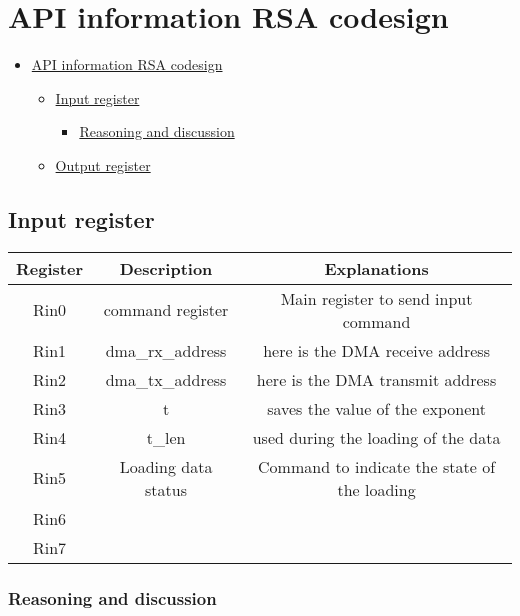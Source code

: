 \documentclass[
]{article}
\author{}
\date{}
\begin{document}
\hypertarget{api-information-rsa-codesign}{%
\section{API information RSA
codesign}\label{api-information-rsa-codesign}}

\begin{itemize}
\tightlist
\item
  \protect\hyperlink{api-information-rsa-codesign}{API information RSA
  codesign}

  \begin{itemize}
  \tightlist
  \item
    \protect\hyperlink{input-register}{Input register}

    \begin{itemize}
    \tightlist
    \item
      \protect\hyperlink{reasoning-and-discussion}{Reasoning and
      discussion}
    \end{itemize}
  \item
    \protect\hyperlink{output-register}{Output register}
  \end{itemize}
\end{itemize}

\hypertarget{input-register}{%
\subsection{Input register}\label{input-register}}

\begin{longtable}[]{@{}ccc@{}}
\toprule
Register & Description & Explanations \\
\midrule
\endhead
Rin0 & command register & Main register to send input command \\
Rin1 & dma\_rx\_address & here is the DMA receive address \\
Rin2 & dma\_tx\_address & here is the DMA transmit address \\
Rin3 & t & saves the value of the exponent \\
Rin4 & t\_len & used during the loading of the data \\
Rin5 & Loading data status & Command to indicate the state of the
loading \\
Rin6 & & \\
Rin7 & & \\
\bottomrule
\end{longtable}

\hypertarget{reasoning-and-discussion}{%
\subsubsection{Reasoning and
discussion}\label{reasoning-and-discussion}}
\end{document}
